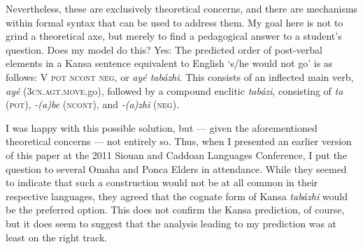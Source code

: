 \documentclass[output=paper]{LSP/langsci}
\begin{document}
Nevertheless, these are exclusively theoretical concerns, and there are mechanisms within formal syntax that can be used to address them. My goal here is not to grind a theoretical axe, but merely to find a pedagogical answer to a student's question. Does my model do this? Yes: The predicted order of post-verbal elements in a Kansa sentence equivalent to English `s/he would not go' is as follows: V \textsc{pot ncont} \textsc{neg}, or \textit{ay\'e tab\'azhi}. This consists of an inflected main verb, \textit{ay\'e} (\textsc{3cn.agt.move}.go), followed by a compound enclitic \textit{tab\'azi}, consisting of \textit{ta} (\textsc{pot}), \textit{-(a)be} (\textsc{ncont}), and \textit{-(a)zhi} (\textsc{neg}).
	
I was happy with this possible solution, but --- given the aforementioned theoretical concerns --- not entirely so. Thus, when I presented an earlier version of this paper at the 2011 Siouan and Caddoan Languages Conference, I put the question to several Omaha and Ponca Elders in attendance. While they seemed to indicate that such a construction would not be at all common in their respective languages, they agreed that the cognate form of Kansa \textit{tab\'azhi} would be the preferred option. This does not confirm the Kansa prediction, of course, but it does seem to suggest that the analysis leading to my prediction was at least on the right track.
\end{document}
